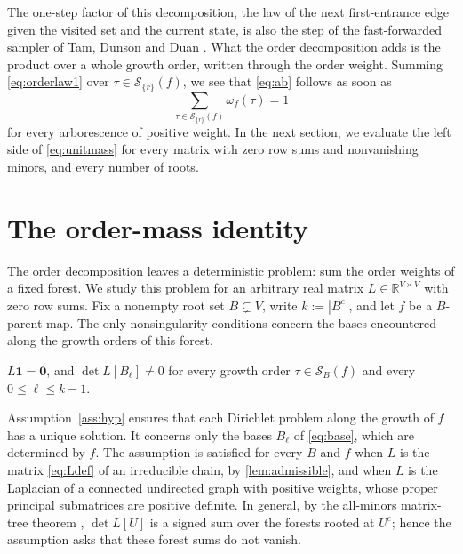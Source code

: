 \documentclass[onefignum,onetabnum]{siamart250211}
\numberwithin{theorem}{section}
\numberwithin{equation}{section}
\newcommand{\Orders}{\mathcal{S}}
\newcommand{\R}{\mathbb{R}}
\newcommand{\one}{\mathbf{1}}
\newcommand{\zero}{\mathbf{0}}
\begin{document}
The one-step factor of this decomposition, the law of the next
first-entrance edge given the visited set and the current state, is
also the step of the fast-forwarded sampler of Tam, Dunson and Duan
\cite{TamDunsonDuan2025}. What the order decomposition adds is the
product over a whole growth order, written through the order weight. Summing \eqref{eq:orderlaw1} over $\tau\in\Orders_{\{r\}}(f)$, we see that
\eqref{eq:ab} follows as soon as
\begin{equation}\label{eq:unitmass}
\sum_{\tau\in\Orders_{\{r\}}(f)}\omega_f(\tau)=1
\end{equation}
for every arborescence of positive weight. In the next section,
we evaluate the left side of \eqref{eq:unitmass} for every matrix with
zero row sums and nonvanishing minors, and every number of roots.

\section{The order-mass identity}\label{sec:identity}

The order decomposition leaves a deterministic problem: sum the order
weights of a fixed forest. We study this problem for an arbitrary real
matrix $L\in\R^{V\times V}$ with zero row sums. Fix a nonempty root
set $B\subsetneq V$, write $k:=|B^c|$, and let $f$ be a $B$-parent map.
The only nonsingularity conditions concern the bases encountered
along the growth orders of this forest.

\begin{assumption}\label{ass:hyp}
$L\one=\zero$, and $\det L[B_\ell]\ne0$ for every growth order
$\tau\in\Orders_B(f)$ and every $0\le \ell\le k-1$.
\end{assumption}

\begin{remark}\label{rem:hyp}
Assumption~\ref{ass:hyp} ensures that each Dirichlet problem along the
growth of $f$ has a unique solution. It concerns only the bases
$B_\ell$ of \eqref{eq:base}, which are determined by $f$. The
assumption is satisfied for every $B$ and $f$
when $L$ is the matrix \eqref{eq:Ldef} of an irreducible chain, by
\cref{lem:admissible}, and when $L$ is the Laplacian of a connected undirected
graph with positive weights, whose proper principal submatrices are
positive definite. In general, by the all-minors matrix-tree theorem
\cite{Chaiken1982}, $\det L[U]$ is a signed sum over the forests rooted
at $U^c$; hence the assumption asks that these forest sums do not
vanish.
\end{remark}
\end{document}
